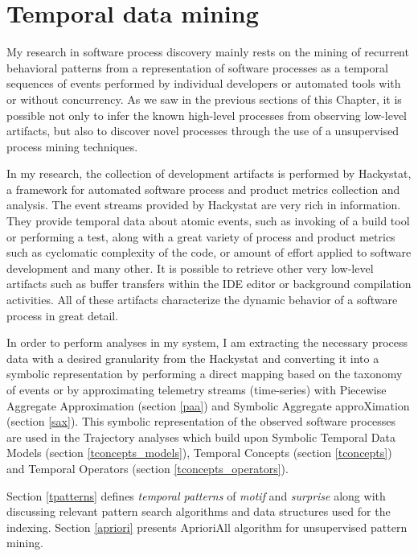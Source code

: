 \section{Temporal data mining} \label{methods}
My research in software process discovery mainly rests on the mining of recurrent behavioral patterns from a representation of software processes as a temporal sequences of events performed by individual developers or automated tools with or without concurrency. As we saw in the previous sections of this Chapter, it is possible not only to infer the known high-level processes from observing low-level artifacts, but also to discover novel processes through the use of a unsupervised process mining techniques.

In my research, the collection of development artifacts is performed by Hackystat, a framework for automated software process and product metrics collection and analysis. The event streams provided by Hackystat are very rich in information. They provide temporal data about atomic events, such as invoking of a build tool or performing a test, along with a great variety of process and product metrics such as cyclomatic complexity of the code, or amount of effort applied to software development and many other. It is possible to retrieve other very low-level artifacts such as buffer transfers within the IDE editor or background compilation activities. All of these artifacts characterize the dynamic behavior of a software process in great detail.

In order to perform analyses in my system, I am extracting the necessary process data with a desired granularity from the Hackystat and converting it into a symbolic representation by performing a direct mapping based on the taxonomy of events or by approximating telemetry streams (time-series) with Piecewise Aggregate Approximation (section \ref{paa}) and Symbolic Aggregate approXimation (section \ref{sax}). This symbolic representation of the observed software processes are used in the Trajectory analyses which build upon Symbolic Temporal Data Models (section \ref{tconcepts_models}), Temporal Concepts (section \ref{tconcepts}) and Temporal Operators (section \ref{tconcepts_operators}). 

Section \ref{tpatterns} defines \textit{temporal patterns} of \textit{motif} and \textit{surprise} along with discussing relevant pattern search algorithms and data structures used for the indexing. Section \ref{apriori} presents AprioriAll algorithm for unsupervised pattern mining.
